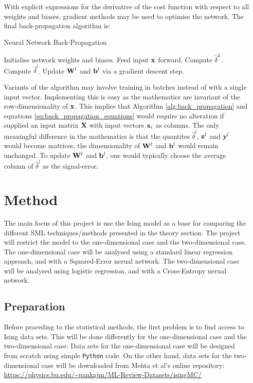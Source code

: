 \documentclass[nofootinbib,reprint,english]{revtex4-1}
\newcommand{\X}{\vb{X}}
\newcommand{\W}{\vb{W}}
\newcommand{\deltahat}{\hat{\delta}}
\begin{document}
With explicit expressions for the derivative of the cost function with respect to all weights and biases, gradient methods may be used to optimise the network. The final back-propagation algorithm is:
\begin{algorithm}[H]
\caption{Neural Network Back-Propagation}\label{alg:back_propagation}
\begin{algorithmic}[1]
\State Initialise network weights and biases.
	\State Feed input \(\vb{x}\) forward.
	\State Compute \(\deltahat^L\).
		\State Compute \(\deltahat^l\).
	\EndFor
		\State Update \(\W^l\) and \(\vb{b}^l\) via a gradient descent step.
	\EndFor
\EndFor
\end{algorithmic}
\end{algorithm}
Variants of the algorithm may involve training in batches instead of with a single input vector. Implementing this is easy as the mathematics are invariant of the row-dimensionality of \(\vb{x}\). This implies that Algorithm \ref{alg:back_propagation} and equations \eqref{eq:back_propagation_equations} would require no alteration if supplied an input matrix \(\X\) with input vectors \(\vb{x}_i\) as columns. The only meaningful difference in the mathematics is that the quantites \(\deltahat^l\), \(\vb{z}^l\) and \(\vb{y}^l\) would become matrices, the dimensionality of \(\W^l\) and \(\vb{b}^l\) would remain unchanged. To update \(\W^l\) and \(\vb{b}^l\), one would typically choose the average column of \(\deltahat^l\) as the signal-error.

\section{Method}
The main focus of this project is use the Ising model as a base for comparing the different SML  techniques/methods presented in the theory section. The project will restrict the model to the one-dimensional case and the two-dimensional case. The one-dimensional case will be analysed using a standard linear regression approach, and with a Squared-Error nerual network. The two-dimensional case will be analysed using logistic regression, and with a Cross-Entropy nerual network.
\subsection{Preparation}
Before proceding to the statistical methods, the first problem is to find access to Ising data sets. This will be done differently for the one-dimensional case and the two-dimensional case: Data sets for the one-dimensional case will be designed from scratch using simple \texttt{Python} code. On the other hand, data sets for the two-dimensional case will be downloaded from Mehta et al's online repository:\\
{\scriptsize\url{https://physics.bu.edu/~pankajm/ML-Review-Datasets/isingMC/}}\\
\end{document}
